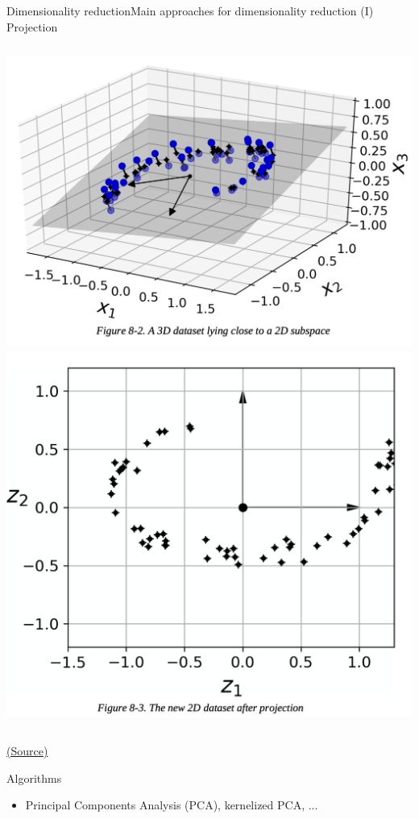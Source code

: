 \documentclass[10pt,compress]{beamer} %
\begin{document}
\begin{frame}{Dimensionality reduction}{Main approaches for dimensionality reduction (I)}
    \centering Projection
    \begin{columns}
	    \includegraphics[width=\textwidth]{figs/subspace_projection.png} 
	    \includegraphics[width=\textwidth]{figs/2d_projection.png} 
    \end{columns}
	\scriptsize\href{https://github.com/Akramz/Hands-on-Machine-Learning-with-Scikit-Learn-Keras-and-TensorFlow/blob/master/08.Dim_Reduction.ipynb}{(Source)}

    \normalsize
    \flushleft
    Algorithms
	\begin{itemize}
		\item Principal Components Analysis (PCA), kernelized PCA, ...
	\end{itemize}
\end{frame}
\end{document}
